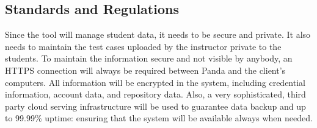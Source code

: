 \subsection{Standards and Regulations}

Since the tool will manage student data, it needs to be secure and private. It
also needs to maintain the test cases uploaded by the instructor private to the
students. To maintain the information secure and not visible by anybody, an
HTTPS connection will always be required between Panda and the client's
computers. All information will be encrypted in the system, including credential
information, account data, and repository data. Also, a very sophisticated,
third party cloud serving infrastructure will be used to guarantee data backup
and up to 99.99\% uptime: ensuring that the system will be available always when
needed.
